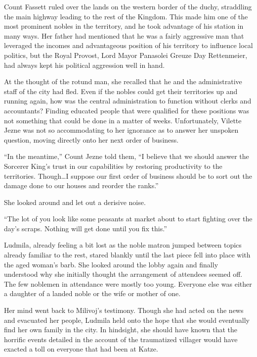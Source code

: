 Count Fassett ruled over the lands on the western border of the duchy, straddling the main highway leading to the rest of the Kingdom. This made him one of the most prominent nobles in the territory, and he took advantage of his station in many ways. Her father had mentioned that he was a fairly aggressive man that leveraged the incomes and advantageous position of his territory to influence local politics, but the Royal Provost, Lord Mayor Panasolei Greuze Day Rettenmeier, had always kept his political aggression well in hand.

 

At the thought of the rotund man, she recalled that he and the administrative staff of the city had fled. Even if the nobles could get their territories up and running again, how was the central administration to function without clerks and accountants? Finding educated people that were qualified for these positions was not something that could be done in a matter of weeks. Unfortunately, Vilette Jezne was not so accommodating to her ignorance as to answer her unspoken question, moving directly onto her next order of business.

 

“In the meantime,” Count Jezne told them, “I believe that we should answer the Sorcerer King’s trust in our capabilities by restoring productivity to the territories. Though…I suppose our first order of business should be to sort out the damage done to our houses and reorder the ranks.”

 

She looked around and let out a derisive noise.

 

“The lot of you look like some peasants at market about to start fighting over the day’s scraps. Nothing will get done until you fix this.”

 

Ludmila, already feeling a bit lost as the noble matron jumped between topics already familiar to the rest, stared blankly until the last piece fell into place with the aged woman’s barb. She looked around the lobby again and finally understood why she initially thought the arrangement of attendees seemed off. The few noblemen in attendance were mostly too young. Everyone else was either a daughter of a landed noble or the wife or mother of one.

 

Her mind went back to Milivoj's testimony. Though she had acted on the news and evacuated her people, Ludmila held onto the hope that she would eventually find her own family in the city. In hindsight, she should have known that the horrific events detailed in the account of the traumatized villager would have exacted a toll on everyone that had been at Katze.

